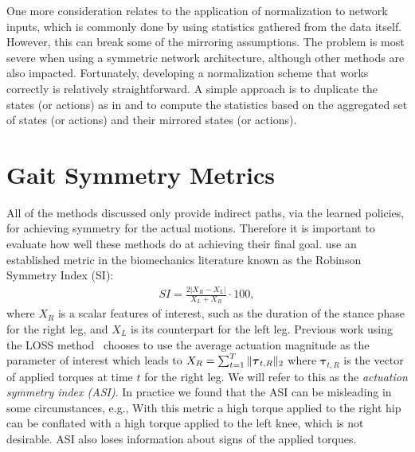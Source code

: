 One more consideration relates to the application of normalization to network inputs, which is commonly done by 
using statistics gathered from the data itself.  
However, this can break some of the mirroring assumptions.  
The problem is most severe when using a symmetric network architecture, although other methods are
also impacted.
Fortunately, developing a normalization scheme that works correctly is relatively straightforward. 
A simple approach is to duplicate the states (or actions) as in  
and to compute the statistics based on the aggregated set of states (or actions) and 
their mirrored states (or actions).



\section{Gait Symmetry Metrics}

All of the methods discussed only provide indirect paths, via the learned policies, 
for achieving symmetry for the actual motions. 
Therefore it is important to evaluate how well these methods do at achieving their final goal. 
\citeauthor{Yu-SIGGRAPH-2018}\cite{Yu-SIGGRAPH-2018} use an established metric in the biomechanics literature 
known as the Robinson Symmetry Index (SI):
\begin{align}
    SI = \frac{2|X_R - X_L|}{X_L + X_R}\cdot 100,
\end{align}
where $X_R$ is a scalar features of interest, such as the duration of the stance phase 
for the right leg, and $X_L$ is its counterpart for the left leg. 
Previous work using the LOSS method~\cite{Yu-SIGGRAPH-2018} chooses to use the average actuation 
magnitude as the parameter of interest which leads to $X_R = \sum_{t=1}^T \|\boldsymbol{\tau}_{t,R}\|_2$ where $\boldsymbol{\tau}_{t,R}$ is the vector of applied torques at time $t$ for the right leg. 
We will refer to this as the \textit{actuation symmetry index (ASI)}.
In practice we found that the ASI can be misleading in some circumstances, 
e.g., With this metric a high torque applied to the right hip can be conflated with a high torque applied to the left knee, 
which is not desirable. ASI also loses information about signs of the applied torques.

